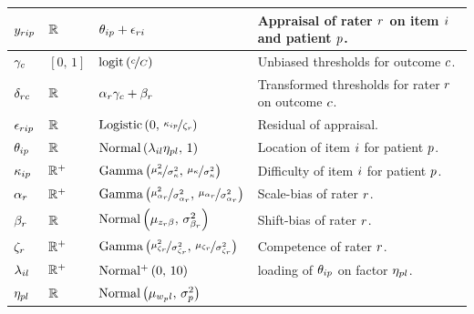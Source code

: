 \documentclass[a4paper,usenames,dvipsnames]{article}
\newenvironment{revision}{\color{black}}{\color{black}}
\begin{document}
\begin{revision}
\begin{table}[!ht]
\begin{tabular}{llll}
			$y_{rip}		$&$	\mathbb{R}			$&$\theta_{ip} + \epsilon_{ri}$&
			\makecell[l]{Appraisal of rater $r$\\on item $i$ and patient $p$.}\\
\midrule
			$\gamma_c 					$&$	[0,\,1]			$&$\logit{\nicefrac{\Incat}{\Tncat}}$&
			\makecell[l]{Unbiased thresholds for\\outcome $c$.}\\
\midrule			
			$\delta_{rc} 				$&$	\mathbb{R}			$&$\alpha_r \gamma_c + \beta_r$&
			\makecell[l]{Transformed thresholds\\for rater $r$ on outcome $c$.}\\
\midrule			
			$\epsilon_{rip}   			$&$	\mathbb{R}			$&$\text{Logistic}\left(0,\,\nicefrac{\kappa_{ip}}{\zeta_r}\right) $&
			Residual of appraisal.\\
\midrule			
			$\theta_{ip}      			$&$	\mathbb{R}			$&$\text{Normal}\left(\lambda_{il}\eta_{pl},\,1\right)$&
			\makecell[l]{Location of item $i$\\for patient $p$.}\\
\midrule			
			$\kappa_{ip}   		$&$	\mathbb{R}^+	$&$\text{Gamma}\left(\nicefrac{\mu_\kappa^2}{\sigma_\kappa^2},\,\nicefrac{\mu_\kappa}{\sigma_\kappa^2}\right) $&
			\makecell[l]{Difficulty of item $i$\\ for patient $p$.}\\
\midrule			
			$\alpha_r      					$&$	\mathbb{R}^+	$&$\text{Gamma}\left(\nicefrac{\mu_{\alpha_r}^2}{\sigma_{\alpha_r}^2},\,\nicefrac{\mu_{\alpha_r}}{\sigma_{\alpha_r}^2}\right) $&
			Scale-bias of rater $r$.\\
\midrule			
			$\beta_r      					$&$	\mathbb{R}			$&$\text{Normal}\left(\mu_{z_r\beta},\,\sigma_{\beta_r}^2\right) $&
			Shift-bias of rater $r$.\\
\midrule			
			$\zeta_r 					$&$	\mathbb{R}^+	$&$\text{Gamma}\left(\nicefrac{\mu_{\zeta_r}^2}{\sigma_{\zeta_r}^2},\,\nicefrac{\mu_{\zeta_r}}{\sigma_{\zeta_r}^2}\right) $&
			Competence of rater $r$.\\
\midrule			
			$\lambda_{il}			$&$	\mathbb{R}^+	$&$\text{Normal\textsuperscript{+}}\left(0,\,10\right)$&
			\makecell[l]{loading of $\theta_{ip}$\\on factor $\eta_{pl}$.}
			\\
\midrule			
			$\eta_{pl} 			$&$ \mathbb{R} 			$&$\text{Normal}\left(\mu_{w_{p}l},\,\sigma_{p}^2\right)$&

\end{tabular}
\end{table}
\end{revision}
\end{document}
